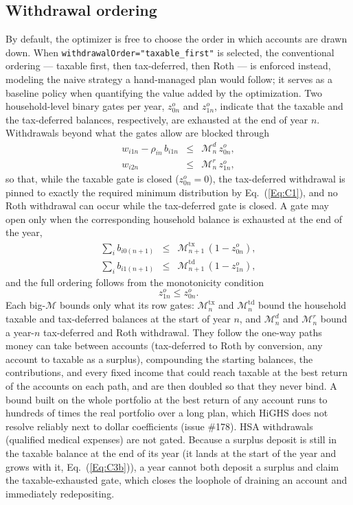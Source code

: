 \documentclass[fleqn,12pt]{report}
\begin{document}
\subsection{Withdrawal ordering}
\label{Sec:WithdrawalOrdering}
	By default, the optimizer is free to choose the order in which accounts are
	drawn down.
	When \texttt{withdrawalOrder="taxable\_first"} is selected, the conventional
	ordering --- taxable first, then tax-deferred, then Roth --- is enforced
	instead, modeling the naive strategy a hand-managed plan would follow; it
	serves as a baseline policy when quantifying the value added by the
	optimization.
	Two household-level binary gates per year, $z^o_{0n}$ and $z^o_{1n}$,
	indicate that the taxable and the tax-deferred balances, respectively, are
	exhausted at the end of year $n$.
	Withdrawals beyond what the gates allow are blocked through
	\begin{eqnarray}
		\label{Eq:WdOrderGates}
		w_{i1n} - \rho_{in}\,b_{i1n} &\le& \mathcal{M}^{d}_n\, z^o_{0n}, \nonumber \\
		w_{i2n} &\le& \mathcal{M}^{r}_n\, z^o_{1n},
	\end{eqnarray}
	so that, while the taxable gate is closed ($z^o_{0n}=0$), the tax-deferred
	withdrawal is pinned to exactly the required minimum distribution by
	Eq.~(\ref{Eq:C1}), and no Roth withdrawal can occur while the tax-deferred
	gate is closed.
	A gate may open only when the corresponding household balance is exhausted
	at the end of the year,
	\begin{eqnarray}
		\label{Eq:WdOrderExhaust}
		\sum_i b_{i0(n+1)} &\le& \mathcal{M}^{\mathrm{tx}}_{n+1}\,(1 - z^o_{0n}), \nonumber \\
		\sum_i b_{i1(n+1)} &\le& \mathcal{M}^{\mathrm{td}}_{n+1}\,(1 - z^o_{1n}),
	\end{eqnarray}
	and the full ordering follows from the monotonicity condition
	\begin{equation}
		\label{Eq:WdOrderMono}
		z^o_{1n} \le z^o_{0n}.
	\end{equation}
	Each big-$\mathcal{M}$ bounds only what its row gates:
	$\mathcal{M}^{\mathrm{tx}}_n$ and $\mathcal{M}^{\mathrm{td}}_n$ bound the household taxable and
	tax-deferred balances at the start of year $n$, and
	$\mathcal{M}^{d}_n$ and $\mathcal{M}^{r}_n$ bound a year-$n$ tax-deferred and Roth withdrawal.
	They follow the one-way paths money can take between accounts
	(tax-deferred to Roth by conversion, any account to taxable as a surplus), compounding
	the starting balances, the contributions, and every fixed income that could reach taxable
	at the best return of the accounts on each path, and are then doubled so that they never bind.
	A bound built on the whole portfolio at the best return of any account runs to hundreds of
	times the real portfolio over a long plan, which HiGHS does not resolve reliably next to
	dollar coefficients (issue \#178).
	HSA withdrawals (qualified medical expenses) are not gated.
	Because a surplus deposit is still in the taxable balance at the end of its year
(it lands at the start of the year and grows with it, Eq.~(\ref{Eq:C3b})), a year
	cannot both deposit a surplus and claim the taxable-exhausted gate, which
	closes the loophole of draining an account and immediately redepositing.
\end{document}
